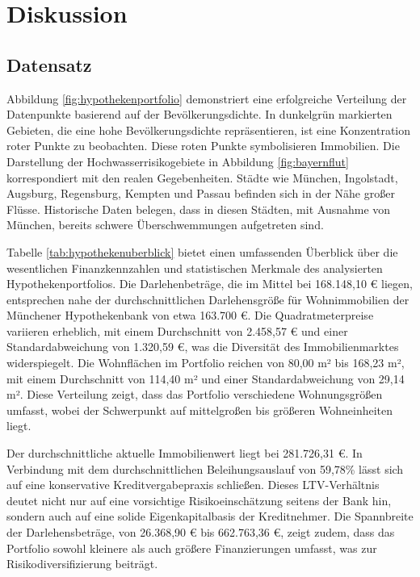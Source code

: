 
\section{Diskussion}\label{kap:6}
\subsection{Datensatz}

Abbildung \ref{fig:hypothekenportfolio} demonstriert eine erfolgreiche Verteilung der Datenpunkte basierend auf der Bevölkerungsdichte. In dunkelgrün markierten Gebieten, die eine hohe Bevölkerungsdichte repräsentieren, ist eine Konzentration roter Punkte zu beobachten. Diese roten Punkte symbolisieren Immobilien.
Die Darstellung der Hochwasserrisikogebiete in Abbildung \ref{fig:bayernflut} korrespondiert mit den realen Gegebenheiten. Städte wie München, Ingolstadt, Augsburg, Regensburg, Kempten und Passau befinden sich in der Nähe großer Flüsse. Historische Daten belegen, dass in diesen Städten, mit Ausnahme von München, bereits schwere Überschwemmungen aufgetreten sind.

Tabelle \ref{tab:hypothekenuberblick} bietet einen umfassenden Überblick über die wesentlichen Finanzkennzahlen und statistischen Merkmale des analysierten Hypothekenportfolios. Die Darlehenbeträge, die im Mittel bei 168.148,10 € liegen, entsprechen nahe der durchschnittlichen Darlehensgröße für Wohnimmobilien der Münchener Hypothekenbank von etwa 163.700 €. Die Quadratmeterpreise variieren erheblich, mit einem Durchschnitt von 2.458,57 € und einer Standardabweichung von 1.320,59 €, was die Diversität des Immobilienmarktes widerspiegelt. Die Wohnflächen im Portfolio reichen von 80,00 m² bis 168,23 m², mit einem Durchschnitt von 114,40 m² und einer Standardabweichung von 29,14 m². Diese Verteilung zeigt, dass das Portfolio verschiedene Wohnungsgrößen umfasst, wobei der Schwerpunkt auf mittelgroßen bis größeren Wohneinheiten liegt.

Der durchschnittliche aktuelle Immobilienwert liegt bei 281.726,31 €. In Verbindung mit dem durchschnittlichen Beleihungsauslauf von 59,78\% lässt sich auf eine konservative Kreditvergabepraxis schließen. Dieses \ac{LTV}-Verhältnis deutet nicht nur auf eine vorsichtige Risikoeinschätzung seitens der Bank hin, sondern auch auf eine solide Eigenkapitalbasis der Kreditnehmer. Die Spannbreite der Darlehensbeträge, von 26.368,90 € bis 662.763,36 €, zeigt zudem, dass das Portfolio sowohl kleinere als auch größere Finanzierungen umfasst, was zur Risikodiversifizierung beiträgt.


